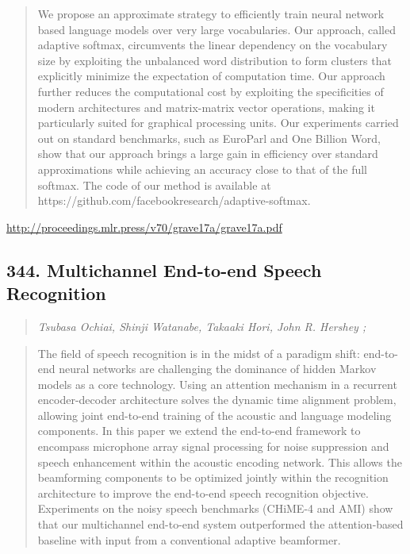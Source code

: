 \documentclass{article}
\begin{document}
\begin{quote}
    We propose an approximate strategy to efficiently train neural network based language models over very large vocabularies. Our approach, called adaptive softmax, circumvents the linear dependency on the vocabulary size by exploiting the unbalanced word distribution to form clusters that explicitly minimize the expectation of computation time. Our approach further reduces the computational cost by exploiting the specificities of modern architectures and matrix-matrix vector operations, making it particularly suited for graphical processing units. Our experiments carried out on standard benchmarks, such as EuroParl and One Billion Word, show that our approach brings a large gain in efficiency over standard approximations while achieving an accuracy close to that of the full softmax. The code of our method is available at https://github.com/facebookresearch/adaptive-softmax.  
\end{quote}

\href{http://proceedings.mlr.press/v70/grave17a/grave17a.pdf}{http://proceedings.mlr.press/v70/grave17a/grave17a.pdf}

\subsection{344. Multichannel End-to-end Speech Recognition}

\begin{quote}
\footnotesize{\textit{Tsubasa Ochiai, Shinji Watanabe, Takaaki Hori, John R. Hershey ;}}

\end{quote}

\begin{quote}
    The field of speech recognition is in the midst of a paradigm shift: end-to-end neural networks are challenging the dominance of hidden Markov models as a core technology. Using an attention mechanism in a recurrent encoder-decoder architecture solves the dynamic time alignment problem, allowing joint end-to-end training of the acoustic and language modeling components. In this paper we extend the end-to-end framework to encompass microphone array signal processing for noise suppression and speech enhancement within the acoustic encoding network. This allows the beamforming components to be optimized jointly within the recognition architecture to improve the end-to-end speech recognition objective. Experiments on the noisy speech benchmarks (CHiME-4 and AMI) show that our multichannel end-to-end system outperformed the attention-based baseline with input from a conventional adaptive beamformer.  
\end{quote}
\end{document}
